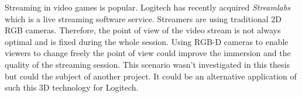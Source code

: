  Streaming in video games is popular. Logitech has recently acquired \textit{Streamlabs} which is a live streaming software service. Streamers are using traditional 2D RGB cameras. Therefore, the point of view of the video stream is not always optimal and is fixed during the whole session. Using RGB-D cameras to enable viewers to change freely the point of view could improve the immersion and the quality of the streaming session. This scenario wasn't investigated in this thesis but could the subject of another project. It could be an alternative application of such this 3D technology for Logitech.

